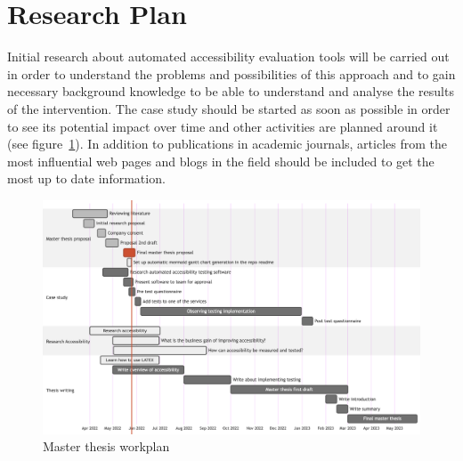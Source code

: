 \documentclass{thesis_proposal}
\begin{document}
\section{Research Plan}
Initial research about automated accessibility evaluation tools will be carried out in order to understand the problems and possibilities of this approach and to gain necessary background knowledge to be able to understand and analyse the results of the intervention.
The case study should be started as soon as possible in order to see its potential impact over time and other activities are planned around it (see figure~\ref{fig:plan}).
In addition to publications in academic journals, articles from the most influential web pages and blogs in the field should be included to get the most up to date information.
\begin{figure}[ht!]
    \includegraphics[width=1\textwidth]{img/timeline.png}
    \caption{Master thesis workplan}
	\label{fig:plan}
\end{figure}

\pagebreak
\printbibliography{}
\nocite{*}
\end{document}
